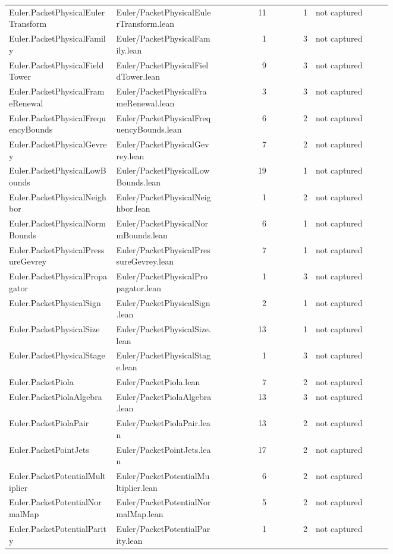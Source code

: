\documentclass[10pt]{article}
\begin{document}
\begin{longtable}{p{0.28\linewidth}p{0.27\linewidth}r r p{0.20\linewidth}}
Euler.PacketPhysicalEulerTransform & Euler/PacketPhysicalEulerTransform.lean & 11 & 1 & not captured\\
Euler.PacketPhysicalFamily & Euler/PacketPhysicalFamily.lean & 1 & 3 & not captured\\
Euler.PacketPhysicalFieldTower & Euler/PacketPhysicalFieldTower.lean & 9 & 3 & not captured\\
Euler.PacketPhysicalFrameRenewal & Euler/PacketPhysicalFrameRenewal.lean & 3 & 3 & not captured\\
Euler.PacketPhysicalFrequencyBounds & Euler/PacketPhysicalFrequencyBounds.lean & 6 & 2 & not captured\\
Euler.PacketPhysicalGevrey & Euler/PacketPhysicalGevrey.lean & 7 & 2 & not captured\\
Euler.PacketPhysicalLowBounds & Euler/PacketPhysicalLowBounds.lean & 19 & 1 & not captured\\
Euler.PacketPhysicalNeighbor & Euler/PacketPhysicalNeighbor.lean & 1 & 2 & not captured\\
Euler.PacketPhysicalNormBounds & Euler/PacketPhysicalNormBounds.lean & 6 & 1 & not captured\\
Euler.PacketPhysicalPressureGevrey & Euler/PacketPhysicalPressureGevrey.lean & 7 & 1 & not captured\\
Euler.PacketPhysicalPropagator & Euler/PacketPhysicalPropagator.lean & 1 & 3 & not captured\\
Euler.PacketPhysicalSign & Euler/PacketPhysicalSign.lean & 2 & 1 & not captured\\
Euler.PacketPhysicalSize & Euler/PacketPhysicalSize.lean & 13 & 1 & not captured\\
Euler.PacketPhysicalStage & Euler/PacketPhysicalStage.lean & 1 & 3 & not captured\\
Euler.PacketPiola & Euler/PacketPiola.lean & 7 & 2 & not captured\\
Euler.PacketPiolaAlgebra & Euler/PacketPiolaAlgebra.lean & 13 & 3 & not captured\\
Euler.PacketPiolaPair & Euler/PacketPiolaPair.lean & 13 & 2 & not captured\\
Euler.PacketPointJets & Euler/PacketPointJets.lean & 17 & 2 & not captured\\
Euler.PacketPotentialMultiplier & Euler/PacketPotentialMultiplier.lean & 6 & 2 & not captured\\
Euler.PacketPotentialNormalMap & Euler/PacketPotentialNormalMap.lean & 5 & 2 & not captured\\
Euler.PacketPotentialParity & Euler/PacketPotentialParity.lean & 1 & 2 & not captured\\

\end{longtable}
\end{document}
